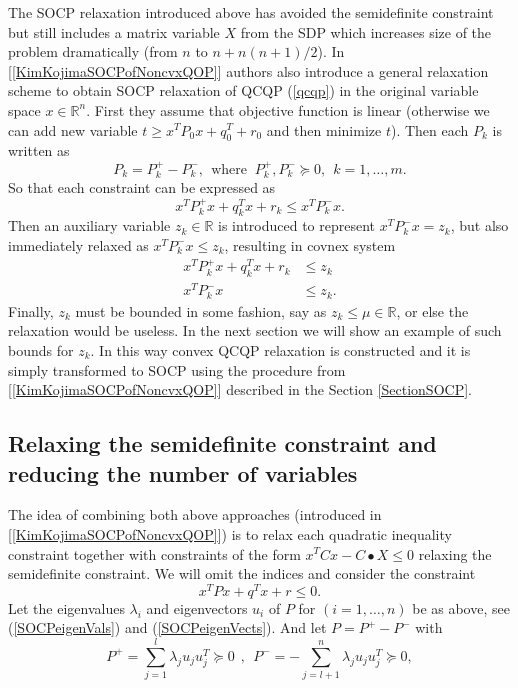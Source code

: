 \documentclass[12pt]{book}
\theoremstyle{definition}
\begin{document}
The SOCP relaxation introduced above has avoided the semidefinite constraint but still includes a matrix variable $X$ from the SDP which increases size of the problem dramatically (from $n$ to $n+ n(n+1)/2$). In [\ref{KimKojimaSOCPofNoncvxQOP}] authors also introduce a general relaxation scheme to obtain SOCP relaxation of QCQP (\ref{qcqp}) in the original variable space $x\in \mathbb{R}^n$. First they assume that objective function is linear (otherwise we can add new variable $t\geq x^TP_0x + q_0^T + r_0$ and then minimize $t$). Then each $P_k$ is written as 
$$P_k=P_k^+ -P_k^-, \ \ \mbox{where } \ P_k^+, P_k^- \succeq 0, \ \ k=1,\dots ,m.$$ 
So that each constraint can be expressed as 
\begin{equation}
x^TP_k^+x + q_k^Tx + r_k \leq x^TP_k^-x.
\end{equation}
Then an auxiliary variable $z_k\in \mathbb{R}$ is introduced to represent $x^TP_k^-x = z_k$, but also immediately relaxed as $x^TP_k^-x \leq z_k$, resulting in covnex system
\begin{equation}
\begin{array}{rl}
x^TP_k^+x + q_k^Tx + r_k &\leq z_k  \\
x^TP_k^-x & \leq z_k.
\end{array} 
\end{equation}
Finally, $z_k$ must be bounded in some fashion, say as $z_k\leq \mu \in \mathbb{R}$, or else the relaxation would be useless. In the next section we will show an example of such bounds for $z_k$.
In this way convex QCQP relaxation is constructed and it is simply transformed to SOCP using the procedure from [\ref{KimKojimaSOCPofNoncvxQOP}] described in the Section \ref{SectionSOCP}. 


%


\subsection{Relaxing the semidefinite constraint and reducing the number of variables}
\label{SubsectionSOCPrelaxInOriginalVariable}

The idea of combining both above approaches (introduced in [\ref{KimKojimaSOCPofNoncvxQOP}]) is to relax each 
quadratic inequality constraint together with constraints of the form $x^TCx-C\bullet X \leq 0$ relaxing the semidefinite constraint. We will omit the indices and consider the constraint
\begin{equation}
\label{SOCPsingleQconst}
x^TPx + q^Tx + r\leq 0.
\end{equation}
Let the eigenvalues $\lambda_i$ and eigenvectors $u_i$ of $P$ for $(i = 1,\dots ,n)$ be as above, see (\ref{SOCPeigenVals}) and (\ref{SOCPeigenVects}). And let $ P = P^+ - P^-$ with 
\begin{equation}
P^+ = \sum_{j = 1}^{l}\lambda_j u_ju_j^T\succeq 0 \ \ , \ \ P^-  = -\sum_{j = l+1}^{n}\lambda_j u_ju_j^T\succeq 0,
\end{equation}
\end{document}
